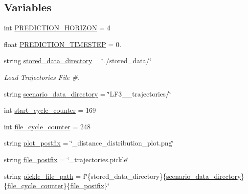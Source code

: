 \subsection*{Variables}
\begin{DoxyCompactItemize}
\item 
int \hyperlink{namespaceimplementation_1_1position__distance__distribution__plotter_aca3116579891a8ad50a6ba54587bfb8c}{P\+R\+E\+D\+I\+C\+T\+I\+O\+N\+\_\+\+H\+O\+R\+I\+Z\+ON} = 4
\item 
float \hyperlink{namespaceimplementation_1_1position__distance__distribution__plotter_af26de4158f9d9bb625b573164d1acb22}{P\+R\+E\+D\+I\+C\+T\+I\+O\+N\+\_\+\+T\+I\+M\+E\+S\+T\+EP} = 0.
\item 
string \hyperlink{namespaceimplementation_1_1position__distance__distribution__plotter_aab3cf32c2c3d618e2cb642e4801432c1}{stored\+\_\+data\+\_\+directory} = \char`\"{}./stored\+\_\+data/\char`\"{}
\begin{DoxyCompactList}\small\item\em Load Trajectories File \#. \end{DoxyCompactList}\item 
string \hyperlink{namespaceimplementation_1_1position__distance__distribution__plotter_a65a50aa1a281d0f113d708b0b239d27b}{scenario\+\_\+data\+\_\+directory} = \char`\"{}L\+F3\+\_\+\_\+trajectories/\char`\"{}
\item 
int \hyperlink{namespaceimplementation_1_1position__distance__distribution__plotter_a5c1107e3165e079bc50bfc328992ebe3}{start\+\_\+cycle\+\_\+counter} = 169
\item 
int \hyperlink{namespaceimplementation_1_1position__distance__distribution__plotter_acf2518bbe622b8cf3015776d5970ede1}{file\+\_\+cycle\+\_\+counter} = 248
\item 
string \hyperlink{namespaceimplementation_1_1position__distance__distribution__plotter_aba42530e444458359de02d82c419aeb2}{plot\+\_\+postfix} = \char`\"{}\+\_\+distance\+\_\+distribution\+\_\+plot.\+png\char`\"{}
\item 
string \hyperlink{namespaceimplementation_1_1position__distance__distribution__plotter_a1df71760c4ec8dbb7f6bbf3a7ab9b709}{file\+\_\+postfix} = \char`\"{}\+\_\+trajectories.\+pickle\char`\"{}
\item 
string \hyperlink{namespaceimplementation_1_1position__distance__distribution__plotter_a2b8ab72df5fc3fee74abddb193c716cc}{pickle\+\_\+file\+\_\+path} = f\char`\"{}\{stored\+\_\+data\+\_\+directory\}\{\hyperlink{namespaceimplementation_1_1position__distance__distribution__plotter_a65a50aa1a281d0f113d708b0b239d27b}{scenario\+\_\+data\+\_\+directory}\}\{\hyperlink{namespaceimplementation_1_1position__distance__distribution__plotter_acf2518bbe622b8cf3015776d5970ede1}{file\+\_\+cycle\+\_\+counter}\}\{\hyperlink{namespaceimplementation_1_1position__distance__distribution__plotter_a1df71760c4ec8dbb7f6bbf3a7ab9b709}{file\+\_\+postfix}\}\char`\"{}

\end{DoxyCompactItemize}
